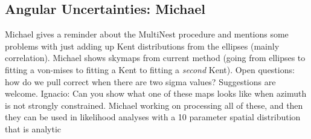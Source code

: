 \subsection{Angular Uncertainties: Michael}
Michael gives a reminder about the MultiNest procedure and mentions some problems with just adding up Kent distributions from the ellipses (mainly correlation). Michael shows skymaps from current method (going from ellipses to fitting a von-mises to fitting a Kent to fitting a \textit{second} Kent). Open questions: how do we pull correct when there are two sigma values? Suggestions are welcome. Ignacio: Can you show what one of these maps looks like when azimuth is not strongly constrained. Michael working on processing all of these, and then they can be used in likelihood analyses with a 10 parameter spatial distribution that is analytic